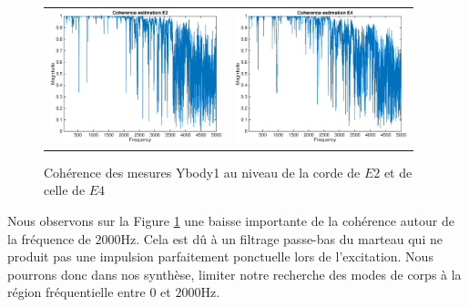 \begin{figure}[h]
\centering
\begin{tabular}{cc}
   \includegraphics[width = 5cm]{figures/coherence_Z_1_E2.eps} &
   \includegraphics[width = 5cm]{figures/coherence_Z_1_E4.eps} \\
\end{tabular}
\caption{Cohérence des mesures Ybody1 au niveau de la corde de \( E2 \) et de celle de \( E4 \)}
\label{fig:gall}
\end{figure}
Nous observons sur la Figure \ref{fig:gall} une baisse importante de la cohérence autour de la fréquence de \( \si{2000\Hz} \). Cela est dû à un filtrage passe-bas du marteau qui ne produit pas une impulsion parfaitement ponctuelle lors de l'excitation. Nous pourrons donc dans nos synthèse, limiter notre recherche des modes de corps à la région fréquentielle entre \( \si{0} \) et \( \si{2000\Hz} \).
